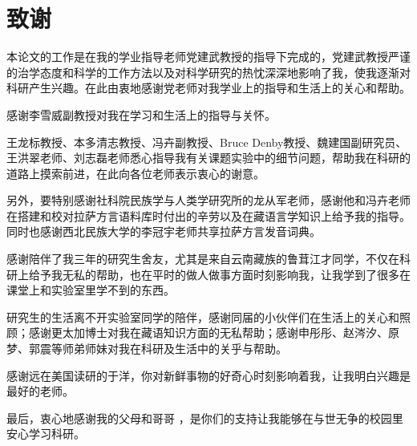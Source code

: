 
\chapter*{致\quad 谢}

\vspace*{1cm}
本论文的工作是在我的学业指导老师党建武教授的指导下完成的，党建武教授严谨的治学态度和科学的工作方法以及对科学研究的热忱深深地影响了我，使我逐渐对科研产生兴趣。在此由衷地感谢党老师对我学业上的指导和生活上的关心和帮助。

感谢李雪威副教授对我在学习和生活上的指导与关怀。

王龙标教授、本多清志教授、冯卉副教授、Bruce Denby教授、魏建国副研究员、王洪翠老师、刘志磊老师悉心指导我有关课题实验中的细节问题，帮助我在科研的道路上摸索前进，在此向各位老师表示衷心的谢意。

另外，要特别感谢社科院民族学与人类学研究所的龙从军老师，感谢他和冯卉老师在搭建和校对拉萨方言语料库时付出的辛劳以及在藏语言学知识上给予我的指导。同时也感谢西北民族大学的李冠宇老师共享拉萨方言发音词典。

感谢陪伴了我三年的研究生舍友，尤其是来自云南藏族的鲁茸江才同学，不仅在科研上给予我无私的帮助，也在平时的做人做事方面时刻影响我，让我学到了很多在课堂上和实验室里学不到的东西。

研究生的生活离不开实验室同学的陪伴，感谢同届的小伙伴们在生活上的关心和照顾；感谢更太加博士对我在藏语知识方面的无私帮助；感谢申彤彤、赵涔汐、原梦、郭震等师弟师妹对我在科研及生活中的关乎与帮助。

感谢远在美国读研的于洋，你对新鲜事物的好奇心时刻影响着我，让我明白兴趣是最好的老师。

最后，衷心地感谢我的父母和哥哥 ，是你们的支持让我能够在与世无争的校园里安心学习科研。
